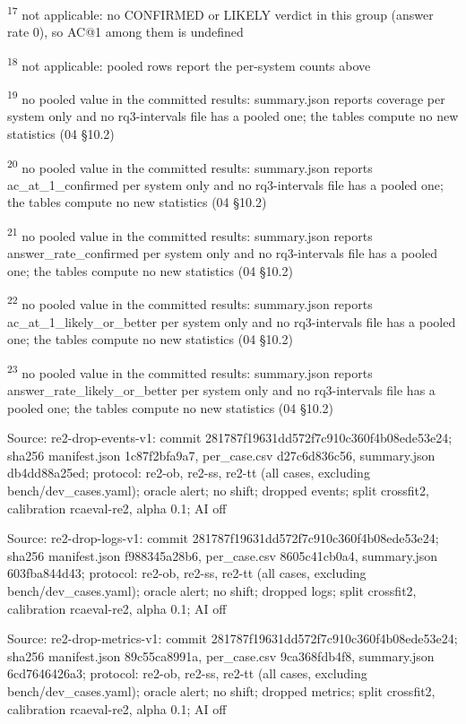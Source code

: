 \textsuperscript{17} not applicable: no CONFIRMED or LIKELY verdict in this group (answer rate 0), so AC@1 among them is undefined\par
\textsuperscript{18} not applicable: pooled rows report the per-system counts above\par
\textsuperscript{19} no pooled value in the committed results: summary.json reports coverage per system only and no rq3-intervals file has a pooled one; the tables compute no new statistics (04 \S{}10.2)\par
\textsuperscript{20} no pooled value in the committed results: summary.json reports ac\_at\_1\_confirmed per system only and no rq3-intervals file has a pooled one; the tables compute no new statistics (04 \S{}10.2)\par
\textsuperscript{21} no pooled value in the committed results: summary.json reports answer\_rate\_confirmed per system only and no rq3-intervals file has a pooled one; the tables compute no new statistics (04 \S{}10.2)\par
\textsuperscript{22} no pooled value in the committed results: summary.json reports ac\_at\_1\_likely\_or\_better per system only and no rq3-intervals file has a pooled one; the tables compute no new statistics (04 \S{}10.2)\par
\textsuperscript{23} no pooled value in the committed results: summary.json reports answer\_rate\_likely\_or\_better per system only and no rq3-intervals file has a pooled one; the tables compute no new statistics (04 \S{}10.2)\par
\noindent Source: re2-drop-events-v1: commit 281787f19631dd572f7c910c360f4b08ede53e24; sha256 manifest.json 1c87f2bfa9a7, per\_case.csv d27c6d836c56, summary.json db4dd88a25ed; protocol: re2-ob, re2-ss, re2-tt (all cases, excluding bench/\allowbreak{}dev\_cases.yaml); oracle alert; no shift; dropped events; split crossfit2, calibration rcaeval-re2, alpha 0.1; AI off\par
\noindent Source: re2-drop-logs-v1: commit 281787f19631dd572f7c910c360f4b08ede53e24; sha256 manifest.json f988345a28b6, per\_case.csv 8605c41cb0a4, summary.json 603fba844d43; protocol: re2-ob, re2-ss, re2-tt (all cases, excluding bench/\allowbreak{}dev\_cases.yaml); oracle alert; no shift; dropped logs; split crossfit2, calibration rcaeval-re2, alpha 0.1; AI off\par
\noindent Source: re2-drop-metrics-v1: commit 281787f19631dd572f7c910c360f4b08ede53e24; sha256 manifest.json 89c55ca8991a, per\_case.csv 9ca368fdb4f8, summary.json 6cd7646426a3; protocol: re2-ob, re2-ss, re2-tt (all cases, excluding bench/\allowbreak{}dev\_cases.yaml); oracle alert; no shift; dropped metrics; split crossfit2, calibration rcaeval-re2, alpha 0.1; AI off\par
